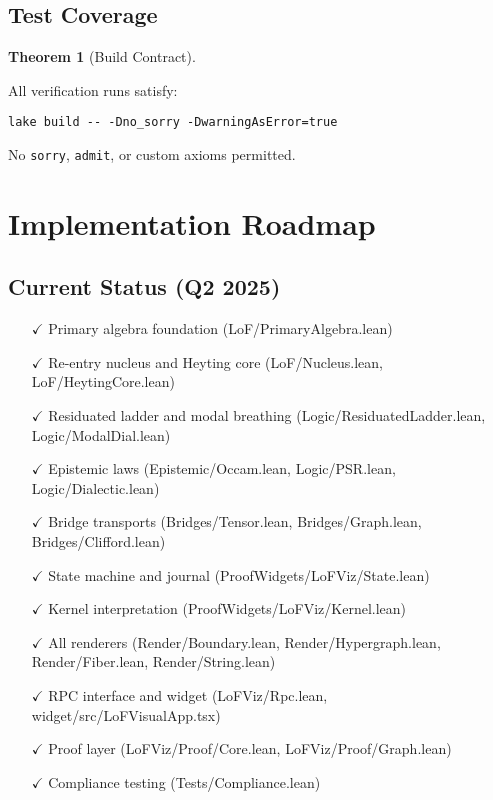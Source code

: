 \documentclass{amsart}
\theoremstyle{definition}
\newtheorem{theorem}[definition]{Theorem}
\theoremstyle{remark}
\begin{document}
\subsection{Test Coverage}
\label{sec:test-coverage}

\begin{theorem}[Build Contract]
\label{thm:build-contract}

All verification runs satisfy:
\begin{verbatim}
lake build -- -Dno_sorry -DwarningAsError=true
\end{verbatim}
No \texttt{sorry}, \texttt{admit}, or custom axioms permitted.
\end{theorem}

\section{Implementation Roadmap}

\subsection{Current Status (Q2 2025)}

\begin{itemize}
\item[$\checkmark$] Primary algebra foundation (LoF/PrimaryAlgebra.lean)
\item[$\checkmark$] Re-entry nucleus and Heyting core (LoF/Nucleus.lean, LoF/HeytingCore.lean)
\item[$\checkmark$] Residuated ladder and modal breathing (Logic/ResiduatedLadder.lean, Logic/ModalDial.lean)
\item[$\checkmark$] Epistemic laws (Epistemic/Occam.lean, Logic/PSR.lean, Logic/Dialectic.lean)
\item[$\checkmark$] Bridge transports (Bridges/Tensor.lean, Bridges/Graph.lean, Bridges/Clifford.lean)
\item[$\checkmark$] State machine and journal (ProofWidgets/LoFViz/State.lean)
\item[$\checkmark$] Kernel interpretation (ProofWidgets/LoFViz/Kernel.lean)
\item[$\checkmark$] All renderers (Render/Boundary.lean, Render/Hypergraph.lean, Render/Fiber.lean, Render/String.lean)
\item[$\checkmark$] RPC interface and widget (LoFViz/Rpc.lean, widget/src/LoFVisualApp.tsx)
\item[$\checkmark$] Proof layer (LoFViz/Proof/Core.lean, LoFViz/Proof/Graph.lean)
\item[$\checkmark$] Compliance testing (Tests/Compliance.lean)
\end{itemize}
\end{document}
